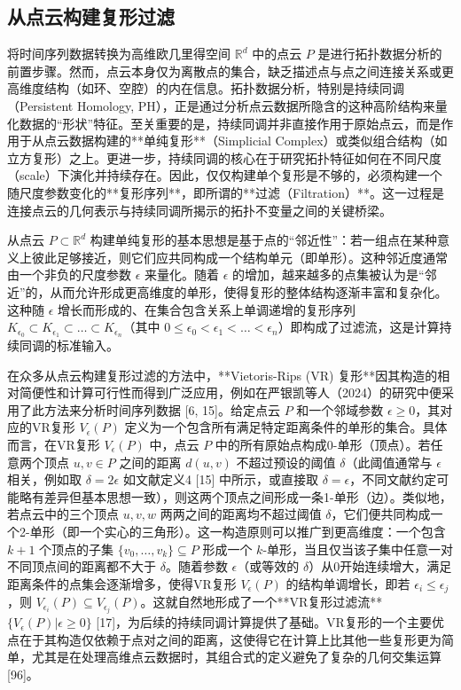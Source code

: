 \subsection{从点云构建复形过滤}
将时间序列数据转换为高维欧几里得空间 $\mathbb{R}^d$ 中的点云 $P$ 是进行拓扑数据分析的前置步骤。然而，点云本身仅为离散点的集合，缺乏描述点与点之间连接关系或更高维度结构（如环、空腔）的内在信息。拓扑数据分析，特别是持续同调（Persistent Homology, PH），正是通过分析点云数据所隐含的这种高阶结构来量化数据的“形状”特征。至关重要的是，持续同调并非直接作用于原始点云，而是作用于从点云数据构建的**单纯复形**（Simplicial Complex）或类似组合结构（如立方复形）之上。更进一步，持续同调的核心在于研究拓扑特征如何在不同尺度（scale）下演化并持续存在。因此，仅仅构建单个复形是不够的，必须构建一个随尺度参数变化的**复形序列**，即所谓的**过滤（Filtration）**。这一过程是连接点云的几何表示与持续同调所揭示的拓扑不变量之间的关键桥梁。

从点云 $P \subset \mathbb{R}^d$ 构建单纯复形的基本思想是基于点的“邻近性”：若一组点在某种意义上彼此足够接近，则它们应共同构成一个结构单元（即单形）。这种邻近度通常由一个非负的尺度参数 $\epsilon$ 来量化。随着 $\epsilon$ 的增加，越来越多的点集被认为是“邻近”的，从而允许形成更高维度的单形，使得复形的整体结构逐渐丰富和复杂化。这种随 $\epsilon$ 增长而形成的、在集合包含关系上单调递增的复形序列 $K_{\epsilon_0} \subset K_{\epsilon_1} \subset \dots \subset K_{\epsilon_n}$（其中 $0 \le \epsilon_0 < \epsilon_1 < \dots < \epsilon_n$）即构成了过滤流，这是计算持续同调的标准输入。

在众多从点云构建复形过滤的方法中，**Vietoris-Rips (VR) 复形**因其构造的相对简便性和计算可行性而得到广泛应用，例如在严银凯等人（2024）的研究中便采用了此方法来分析时间序列数据 [6, 15]。给定点云 $P$ 和一个邻域参数 $\epsilon \ge 0$，其对应的VR复形 $V_\epsilon(P)$ 定义为一个包含所有满足特定距离条件的单形的集合。具体而言，在VR复形 $V_\epsilon(P)$ 中，点云 $P$ 中的所有原始点构成0-单形（顶点）。若任意两个顶点 $u,v \in P$ 之间的距离 $d(u,v)$ 不超过预设的阈值 $\delta$（此阈值通常与 $\epsilon$ 相关，例如取 $\delta=2\epsilon$ 如文献定义4 [15] 中所示，或直接取 $\delta=\epsilon$，不同文献约定可能略有差异但基本思想一致），则这两个顶点之间形成一条1-单形（边）。类似地，若点云中的三个顶点 $u,v,w$ 两两之间的距离均不超过阈值 $\delta$，它们便共同构成一个2-单形（即一个实心的三角形）。这一构造原则可以推广到更高维度：一个包含 $k+1$ 个顶点的子集 $\{v_0, \dots, v_k\} \subseteq P$ 形成一个 $k$-单形，当且仅当该子集中任意一对不同顶点间的距离都不大于 $\delta$。随着参数 $\epsilon$（或等效的 $\delta$）从0开始连续增大，满足距离条件的点集会逐渐增多，使得VR复形 $V_\epsilon(P)$ 的结构单调增长，即若 $\epsilon_i \le \epsilon_j$，则 $V_{\epsilon_i}(P) \subseteq V_{\epsilon_j}(P)$。这就自然地形成了一个**VR复形过滤流** $\{V_\epsilon(P) | \epsilon \ge 0\}$ [17]，为后续的持续同调计算提供了基础。VR复形的一个主要优点在于其构造仅依赖于点对之间的距离，这使得它在计算上比其他一些复形更为简单，尤其是在处理高维点云数据时，其组合式的定义避免了复杂的几何交集运算 [96]。

